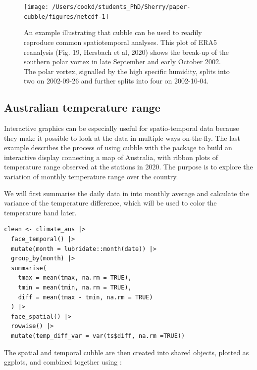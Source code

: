 \documentclass[
  shortnames]{jss}
\begin{document}
\begin{CodeChunk}
\begin{figure}

{\centering \texttt{[image: /Users/cookd/students\_PhD/Sherry/paper-cubble/figures/netcdf-1]} 

}

\caption[An example illustrating that cubble can be used to readily reproduce common spatiotemporal analyses]{An example illustrating that cubble can be used to readily reproduce common spatiotemporal analyses. This plot of ERA5 reanalysis (Fig. 19, Hersbach et al, 2020) shows the break-up of the southern polar vortex in late September and early October 2002. The polar vortex, signalled by the high specific humidity, splits into two on 2002-09-26 and further splits into four on 2002-10-04.}\label{fig:netcdf}
\end{figure}
\end{CodeChunk}

\hypertarget{australian-temperature-range}{%
\subsection{Australian temperature range}\label{australian-temperature-range}}

Interactive graphics can be especially useful for spatio-temporal data because they make it possible to look at the data in multiple ways on-the-fly. The last example describes the process of using cubble with the  package to build an interactive display connecting a map of Australia, with ribbon plots of temperature range observed at the stations in 2020. The purpose is to explore the variation of monthly temperature range over the country.

We will first summarise the daily data in  into monthly average and calculate the variance of the temperature difference, which will be used to color the temperature band later.

\begin{verbatim}
clean <- climate_aus |>
  face_temporal() |> 
  mutate(month = lubridate::month(date)) |>
  group_by(month) |>
  summarise(
    tmax = mean(tmax, na.rm = TRUE),
    tmin = mean(tmin, na.rm = TRUE),
    diff = mean(tmax - tmin, na.rm = TRUE)
  ) |> 
  face_spatial() |> 
  rowwise() |>
  mutate(temp_diff_var = var(ts$diff, na.rm =TRUE))
\end{verbatim}

The spatial and temporal cubble are then created into shared  objects, plotted as ggplots, and combined together using :
\end{document}
